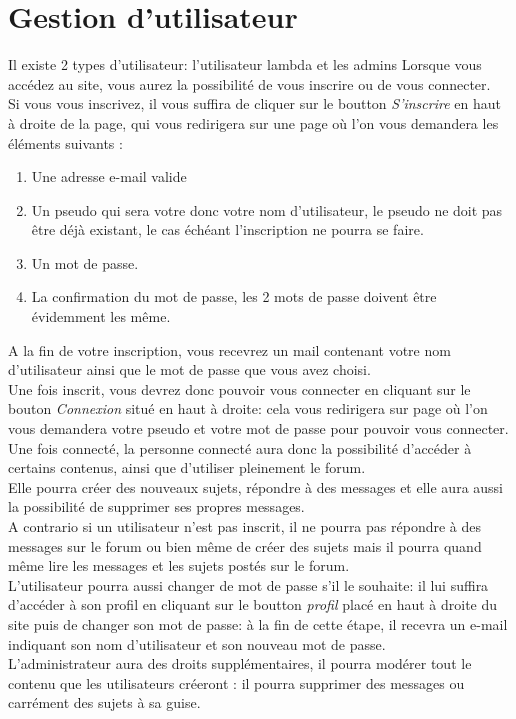 \documentclass[a4paper, 11pt]{article}
\begin{document}
\section{Gestion d'utilisateur}
Il existe 2 types d'utilisateur: l'utilisateur lambda et les admins
Lorsque vous accédez au site, vous aurez la possibilité de vous inscrire ou de vous connecter.\\
Si vous vous inscrivez, il vous suffira de cliquer sur le boutton \textit{S'inscrire} en haut à droite de la page, qui vous redirigera sur une page où l'on
vous demandera les éléments suivants :
\begin{enumerate}
\item Une adresse e-mail valide
\item Un pseudo qui sera votre donc votre nom d'utilisateur, le pseudo ne doit pas être déjà existant, le cas échéant l'inscription ne pourra se faire.
\item Un mot de passe.
\item La confirmation du mot de passe, les 2 mots de passe doivent être évidemment les même.
\end{enumerate}
A la fin de votre inscription, vous recevrez un mail contenant votre nom d'utilisateur ainsi que le mot de passe que vous avez choisi.\\
Une fois inscrit, vous devrez donc pouvoir vous connecter en cliquant sur le bouton \textit{Connexion} situé en haut à droite: cela vous redirigera sur page où l'on vous demandera votre pseudo et votre mot de passe pour pouvoir vous connecter.\\
Une fois connecté, la personne connecté aura donc la possibilité d'accéder à certains contenus, ainsi que d'utiliser pleinement le forum.\\
Elle pourra créer des nouveaux sujets, répondre à des messages et elle aura aussi la possibilité de supprimer ses propres messages.\\
A contrario si un utilisateur n'est pas inscrit, il ne pourra pas répondre à des messages sur le forum ou bien même de créer des sujets mais il pourra quand même lire les messages et les sujets postés sur le forum.\\
L'utilisateur pourra aussi changer de mot de passe s'il le souhaite: il lui suffira d'accéder à son profil en cliquant sur le boutton \textit{profil} placé en haut à droite du site puis de changer son mot de passe: à la fin de cette étape, il recevra un e-mail indiquant son nom d'utilisateur et son nouveau mot de passe.\\
L'administrateur aura des droits supplémentaires, il pourra modérer tout le contenu que les utilisateurs créeront : il pourra supprimer des messages ou carrément des sujets à sa guise.
\end{document}
